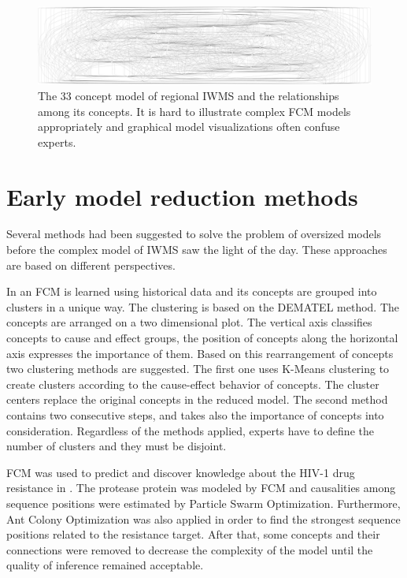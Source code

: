 \documentclass[graybox]{svmult}
\begin{document}
\begin{figure}[hbt]
  \begin{center}
    \includegraphics[width=\textwidth]{fcm_big.pdf}
  \end{center}
  \caption{The 33 concept model of regional IWMS and the relationships among its concepts. It is hard to illustrate complex FCM models appropriately and graphical model visualizations often confuse experts.}
  \label{fig:fcmbig}
\end{figure}

\section{Early model reduction methods}
\label{sec:2}

Several methods had been suggested to solve the problem of oversized models before the complex model of IWMS saw the light of the day. These approaches are based on different perspectives.

In \cite{alizadeh2008using} an FCM is learned using historical data and its concepts are grouped into clusters in a unique way. The clustering is based on the DEMATEL \cite{dematel} method. The concepts are arranged on a two dimensional plot. The vertical axis classifies concepts to cause and effect groups, the position of concepts along the horizontal axis expresses the importance of them. Based on this rearrangement of concepts two clustering methods are suggested. The first one uses K-Means clustering to create clusters according to the cause-effect behavior of concepts. The cluster centers replace the original concepts in the reduced model. The second method contains two consecutive steps, and takes also the importance of concepts into consideration. Regardless of the methods applied, experts have to define the number of clusters and they must be disjoint.

FCM was used to predict and discover knowledge about the HIV-1 drug resistance in \cite{NapolesHIV}. The protease protein was modeled by FCM and causalities among sequence positions were estimated by Particle Swarm Optimization. Furthermore, Ant Colony Optimization was also applied in order to find the strongest sequence positions related to the resistance target. After that, some concepts and their connections were removed to decrease the complexity of the model until the quality of inference remained acceptable.
\end{document}
